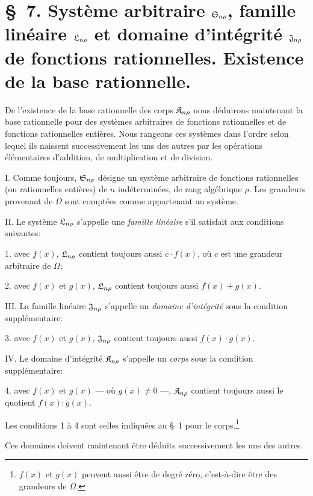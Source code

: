 \section*{\S\ 7. Système arbitraire $\mathfrak{S}_{n\rho}$, famille linéaire $\mathfrak{L}_{n\rho}$ et domaine d’intégrité $\mathfrak{J}_{n\rho}$ de fonctions rationnelles. Existence de la base rationnelle.}

De l'existence de la base rationnelle des corps $\mathfrak{K}_{n\rho}$ nous déduirons maintenant la base rationnelle pour des systèmes arbitraires de fonctions rationnelles et de fonctions rationnelles entières. Nous rangeons ces systèmes dans l'ordre selon lequel ils naissent successivement les uns des autres par les opérations élémentaires d'addition, de multiplication et de division.

I. Comme toujours, $\mathfrak{S}_{n\rho}$ désigne un système arbitraire de fonctions rationnelles (ou rationnelles entières) de $n$ indéterminées, de rang algébrique $\rho$. Les grandeurs provenant de $\Omega$ sont comptées comme appartenant au système.

II. Le système $\mathfrak{L}_{n\rho}$ s'appelle une \emph{famille linéaire} s'il satisfait aux conditions suivantes:

1. avec $f(x)$, $\mathfrak{L}_{n\rho}$ contient toujours aussi $c\cdot f(x)$, où $c$ est une grandeur arbitraire de $\Omega$;

2. avec $f(x)$ et $g(x)$, $\mathfrak{L}_{n\rho}$ contient toujours aussi $f(x)+g(x)$.

III. La famille linéaire $\mathfrak{J}_{n\rho}$ s'appelle un \emph{domaine d’intégrité} sous la condition supplémentaire:

3. avec $f(x)$ et $g(x)$, $\mathfrak{J}_{n\rho}$ contient toujours aussi $f(x)\cdot g(x)$.

IV. Le domaine d’intégrité $\mathfrak{K}_{n\rho}$ s'appelle un \emph{corps} sous la condition supplémentaire:

4. avec $f(x)$ et $g(x)$ --- où $g(x)\ne0$ ---, $\mathfrak{K}_{n\rho}$ contient toujours aussi le quotient $f(x):g(x)$.

Les conditions 1 à 4 sont celles indiquées au \S\ 1 pour le corps.\footnote{$f(x)$ et $g(x)$ peuvent aussi être de degré zéro, c'est-à-dire être des grandeurs de $\Omega$.}

Ces domaines doivent maintenant être déduits successivement les uns des autres.

